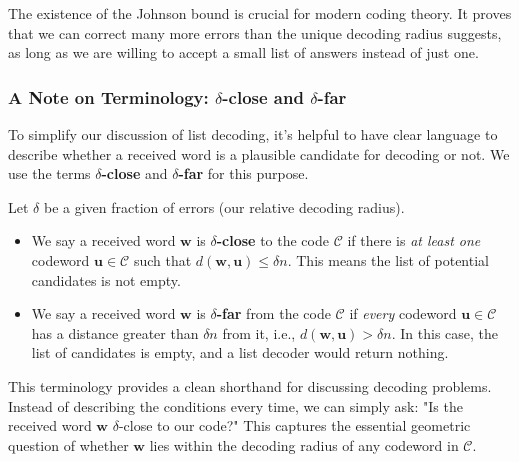 \documentclass{article}
\begin{document}
The existence of the Johnson bound is crucial for modern coding theory. It proves that we can correct many more errors than the unique decoding radius suggests, as long as we are willing to accept a small list of answers instead of just one.




\subsubsection{A Note on Terminology: $\delta$-close and $\delta$-far}
To simplify our discussion of list decoding, it's helpful to have clear language to describe whether a received word is a plausible candidate for decoding or not. We use the terms \textbf{$\delta$-close} and \textbf{$\delta$-far} for this purpose.

\begin{tcolorbox}[breakable, title={Definitions}]
Let $\delta$ be a given fraction of errors (our relative decoding radius).
\begin{itemize}
    \item We say a received word $\mathbf{w}$ is \textbf{$\delta$-close} to the code $\mathcal{C}$ if there is \textit{at least one} codeword $\mathbf{u} \in \mathcal{C}$ such that $d(\mathbf{w}, \mathbf{u}) \le \delta n$. This means the list of potential candidates is not empty.

    \item We say a received word $\mathbf{w}$ is \textbf{$\delta$-far} from the code $\mathcal{C}$ if \textit{every} codeword $\mathbf{u} \in \mathcal{C}$ has a distance greater than $\delta n$ from it, i.e., $d(\mathbf{w}, \mathbf{u}) > \delta n$. In this case, the list of candidates is empty, and a list decoder would return nothing.
\end{itemize}
\end{tcolorbox}

This terminology provides a clean shorthand for discussing decoding problems. Instead of describing the conditions every time, we can simply ask: "Is the received word $\mathbf{w}$ $\delta$-close to our code?" This captures the essential geometric question of whether $\mathbf{w}$ lies within the decoding radius of any codeword in $\mathcal{C}$.


\end{document}
